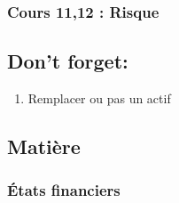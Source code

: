 \documentclass[11pt]{article}
\begin{document}
\subsubsection{Cours 11,12 : Risque}
\label{sec:orgae14b1d}
\subsection{Don't forget:}
\label{sec:orgef9dc84}

\begin{enumerate}
\item Remplacer ou pas un actif
\label{sec:org348bb63}
\end{enumerate}
\subsection{Matière}
\label{sec:org1d7244b}

\subsubsection{États financiers}
\label{sec:orgebe8c06}
\end{document}
